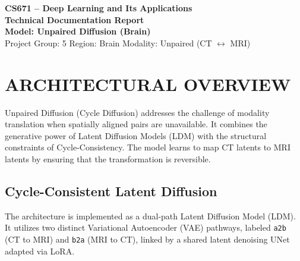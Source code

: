 \documentclass[10pt,a4paper]{article}
\begin{document}
\begin{tcolorbox}[
  enhanced,
  colback=softbg,
  colframe=brand,
  boxrule=0.9pt,
  arc=2mm,
  left=5pt,right=5pt,top=5pt,bottom=5pt
]
\centering
{\Large\bfseries\color{brand} CS671 -- Deep Learning and Its Applications}\\[2pt]
{\large\bfseries Technical Documentation Report}\\[6pt]
{\normalsize\bfseries Model: Unpaired Diffusion (Brain)}\\[4pt]
\small
Project Group: 5 \quad Region: Brain \quad Modality: Unpaired (CT $\leftrightarrow$ MRI)
\end{tcolorbox}

\section{ARCHITECTURAL OVERVIEW}
Unpaired Diffusion (Cycle Diffusion) addresses the challenge of modality translation when spatially aligned pairs are unavailable. It combines the generative power of Latent Diffusion Models (LDM) with the structural constraints of Cycle-Consistency. The model learns to map CT latents to MRI latents by ensuring that the transformation is reversible.

\subsection{Cycle-Consistent Latent Diffusion}
The architecture is implemented as a dual-path Latent Diffusion Model (LDM). It utilizes two distinct Variational Autoencoder (VAE) pathways, labeled \texttt{a2b} (CT to MRI) and \texttt{b2a} (MRI to CT), linked by a shared latent denoising UNet adapted via LoRA.
\end{document}
